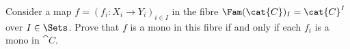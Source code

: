 \begin{exercise}
Consider a map \(f = \left(f_i : X_i \to Y_i\right)_{i \in I}\) in the fibre \(\Fam(\cat{C})_I = \cat{C}^I\) over \(I \in \Sets\).
Prove that \(f\) is a mono in this fibre if and only if each \(f_i\) is a mono in \(\cat{C}\).
\end{exercise}